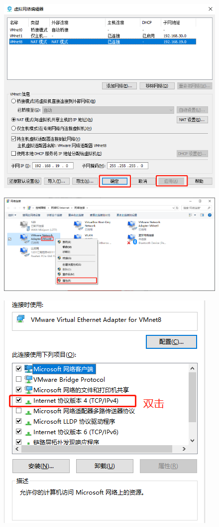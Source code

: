 \documentclass[12pt, openany, oneside]{book}
\begin{document}
\begin{figure}[H]
	\centering
	\includegraphics[scale=0.6]{img/C1/1-4/7.png}
\end{figure}

\begin{figure}[H]
	\centering
	\includegraphics[scale=0.4]{img/C1/1-4/8.png}
\end{figure}

\begin{figure}[H]
	\centering
	\includegraphics[scale=0.7]{img/C1/1-4/9.png}
\end{figure}
\end{document}
